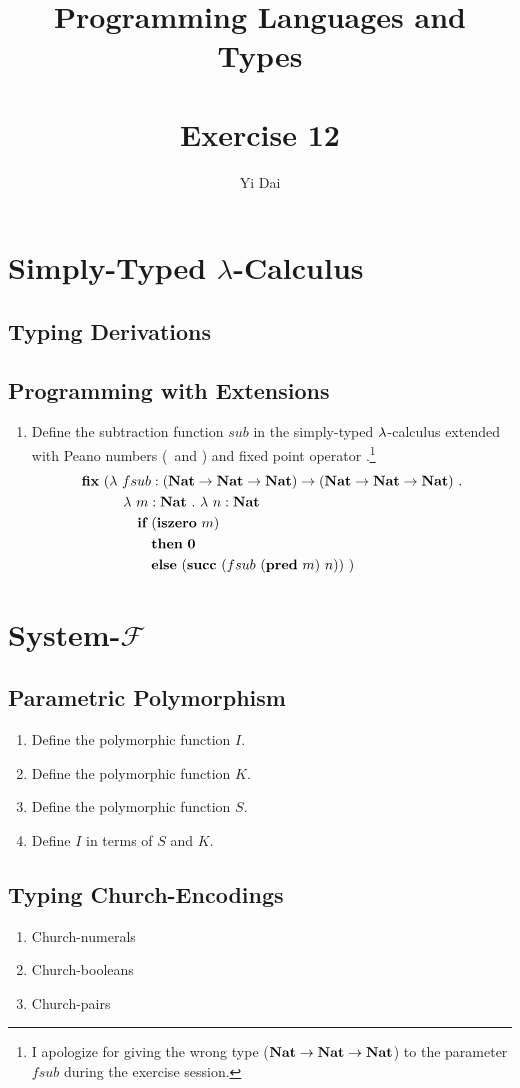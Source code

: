 \documentclass[a4paper,12pt]{article}
\title{
 Programming Languages and Types \\~\\
 \textbf{Exercise 12}
}
\author{
 Yi Dai
}
\begin{document}
\maketitle

\section{Simply-Typed $\lambda$-Calculus}

\subsection{Typing Derivations}

\subsection{Programming with Extensions}

\begin{enumerate}
 \item Define the subtraction function $sub$ in the simply-typed $\lambda$-calculus extended with Peano numbers
  (\zero\ and \succ) and fixed point operator \fixp.\footnote{I apologize for giving the wrong type ($\textbf{Nat}
  \rightarrow \textbf{Nat} \rightarrow \textbf{Nat}$) to the parameter $fsub$ during the exercise session.}
  \begin{align*}
   \fixp\ (& \lamb\ fsub : (\NatT \rarr \NatT \rarr \NatT) \rarr (\NatT \rarr \NatT \rarr \NatT)\ . \\
           & \quad \lamb\ m : \NatT\ .\ \lamb\ n : \NatT \\
           & \quad \quad \ifkw\ (\isze\ m) \\
           & \quad \quad \quad \thkw\ \zero \\
           & \quad \quad \quad \elkw\ (\succ\ (fsub\ (\pred\ m)\ n))\ )
  \end{align*}
\end{enumerate}

\section{System-$\mathcal{F}$}

\subsection{Parametric Polymorphism}

\begin{enumerate}
 \item Define the polymorphic function $I$.
 \item Define the polymorphic function $K$.
 \item Define the polymorphic function $S$.
 \item Define $I$ in terms of $S$ and $K$.
\end{enumerate}

\subsection{Typing Church-Encodings}

\begin{enumerate}
 \item Church-numerals
 \item Church-booleans
 \item Church-pairs
\end{enumerate}
\end{document}
